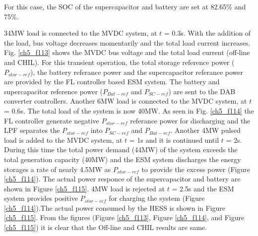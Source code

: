 For this case, the SOC of the supercapacitor and battery are set at 82.65\% and 75\%. 


34MW load is connected to the MVDC system, at $t$ = 0.3s. With the addition of the load, bus voltage decreases momentarily and  the total load current increases. Fig. \ref{ch5_f113} shows the MVDC bus voltage and the total load current (off-line and CHIL). For this transient operation, the total storage reference power ($P_{stor-ref}$), the battery referance power and the supercapacitor referance power are provided by the FL controller based ESM system. The battery and supercapacitor reference power ($P_{Bat-ref}$ and $P_{SC-ref}$) are sent to the DAB converter controllers. Another 6MW load is connected to the MVDC system, at $t$ = 0.6s. The total load of the system is now 40MW. As seen in Fig. \ref{ch5_f114} the FL controller generate negative $P_{stor-ref}$ referance power for discharging and the LPF separates the $P_{stor-ref}$  into $P_{SC-ref}$ and $P_{Bat-ref}$. Another 4MW pulsed load is added to the MVDC system, at $t$ = 1s and it is continued until $t$ = 2s. During this time the total power demand (44MW) of the system exceeds the total generation capacity (40MW) and the ESM system discharges the energy storages a rate of nearly 4.5MW as $P_{stor-ref}$ to provide the excess power (Figure \ref{ch5_f114}). The actual power responce of the supercapacitor and battery are shown in  Figure \ref{ch5_f115}. 4MW load is rejected at $t$ = 2.5s and the ESM system provides positive $P_{stor-ref}$ for charging the system (Figure \ref{ch5_f114}).The actual power consumed by the HESS is shown in  Figure \ref{ch5_f115}. From the figures (Figure \ref{ch5_f113}, Figure \ref{ch5_f114}, and Figure \ref{ch5_f115}) it is clear that the Off-line and CHIL results are same. 


